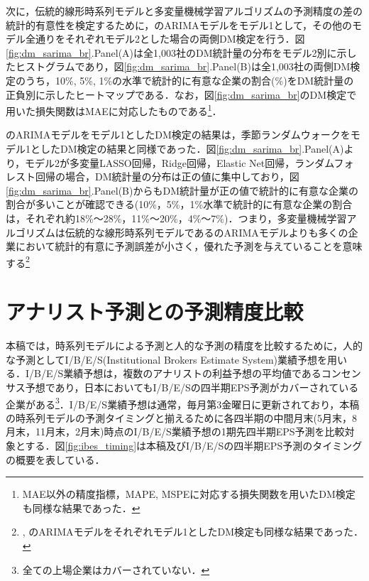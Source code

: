 \documentclass[a4paper，12pt]{jsarticle}
\begin{document}
次に，伝統的線形時系列モデルと多変量機械学習アルゴリズムの予測精度の差の統計的有意性を検定するために，\cite{brown1979univariate}のARIMAモデルをモデル1として，その他のモデル全通りをそれぞれモデル2とした場合の両側DM検定を行う．図\ref{fig:dm_sarima_br}.Panel(A)は全1,003社のDM統計量の分布をモデル2別に示したヒストグラムであり，図\ref{fig:dm_sarima_br}.Panel(B)は全1,003社の両側DM検定のうち，10\%, 5\%, 1\%の水準で統計的に有意な企業の割合(\%)をDM統計量の正負別に示したヒートマップである．なお，図\ref{fig:dm_sarima_br}のDM検定で用いた損失関数はMAEに対応したものである\footnote{MAE以外の精度指標，MAPE, MSPEに対応する損失関数を用いたDM検定も同様な結果であった．}．

\cite{brown1979univariate}のARIMAモデルをモデル1としたDM検定の結果は，季節ランダムウォークをモデル1としたDM検定の結果と同様であった．図\ref{fig:dm_sarima_br}.Panel(A)より，モデル2が多変量LASSO回帰，Ridge回帰，Elastic Net回帰，ランダムフォレスト回帰の場合，DM統計量の分布は正の値に集中しており，図\ref{fig:dm_sarima_br}.Panel(B)からもDM統計量が正の値で統計的に有意な企業の割合が多いことが確認できる(10\%，5\%，1\%水準で統計的に有意な企業の割合は，それぞれ約18\%～28\%，11\%～20\%，4\%～7\%)．つまり，多変量機械学習アルゴリズムは伝統的な線形時系列モデルである\cite{brown1979univariate}のARIMAモデルよりも多くの企業において統計的有意に予測誤差が小さく，優れた予測を与えていることを意味する\footnote{\cite{foster1977quarterly}, \cite{griffin1977time}のARIMAモデルをそれぞれモデル1としたDM検定も同様な結果であった．}

\section{アナリスト予測との予測精度比較}

本稿では，時系列モデルによる予測と人的な予測の精度を比較するために，人的な予測としてI/B/E/S(Institutional Brokers Estimate System)業績予想を用いる．I/B/E/S業績予想は，複数のアナリストの利益予想の平均値であるコンセンサス予想であり，日本においてもI/B/E/Sの四半期EPS予測がカバーされている企業がある\footnote{全ての上場企業はカバーされていない．}．I/B/E/S業績予想は通常，毎月第3金曜日に更新されており，本稿の時系列モデルの予測タイミングと揃えるために各四半期の中間月末(5月末，8月末，11月末，2月末)時点のI/B/E/S業績予想の1期先四半期EPS予測を比較対象とする．図\ref{fig:ibes_timing}は本稿及びI/B/E/Sの四半期EPS予測のタイミングの概要を表している．
\end{document}
